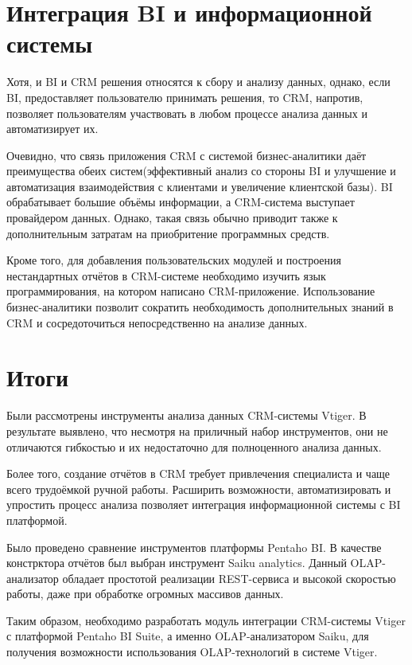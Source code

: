 \section{Интеграция BI и информационной системы}

Хотя, и BI и CRM решения относятся к сбору и анализу данных, однако, если BI, предоставляет пользователю принимать решения, то CRM, напротив, позволяет пользователям участвовать в любом процессе анализа данных и автоматизирует их.

Очевидно, что связь приложения CRM с системой бизнес-аналитики даёт преимущества обеих систем(эффективный анализ со стороны BI и улучшение и автоматизация взаимодействия с клиентами и увеличение клиентской базы). BI обрабатывает большие объёмы информации, а CRM-система выступает провайдером данных. Однако, такая связь обычно приводит также к дополнительным затратам на приобритение программных средств.

Кроме того, для добавления пользовательских модулей и построения нестандартных отчётов в CRM-системе необходимо изучить язык программирования, на котором написано CRM-приложение. Использование бизнес-аналитики позволит сократить необходимость дополнительных знаний в CRM и сосредоточиться непосредственно на анализе данных.

\section{Итоги}

Были рассмотрены инструменты анализа данных CRM-системы Vtiger. В результате выявлено, что несмотря на приличный набор инструментов, они не отличаются гибкостью и их недостаточно для полноценного анализа данных. 

Более того, создание отчётов в CRM требует привлечения специалиста и чаще всего трудоёмкой ручной работы. Расширить возможности, автоматизировать и упростить процесс анализа позволяет интеграция информационной системы с BI платформой. 

Было проведено сравнение инструментов платформы Pentaho BI. В качестве констрктора отчётов был выбран инструмент Saiku analytics. Данный OLAP-анализатор обладает простотой реализации REST-сервиса и высокой скоростью работы, даже при обработке огромных массивов данных.

Таким образом, необходимо разработать модуль интеграции CRM-системы Vtiger с платформой Pentaho BI Suite, а именно OLAP-анализатором Saiku, для получения возможности использования OLAP-технологий в системе Vtiger.

\nocite{pivot4j}
\nocite{saikuVsPivot}